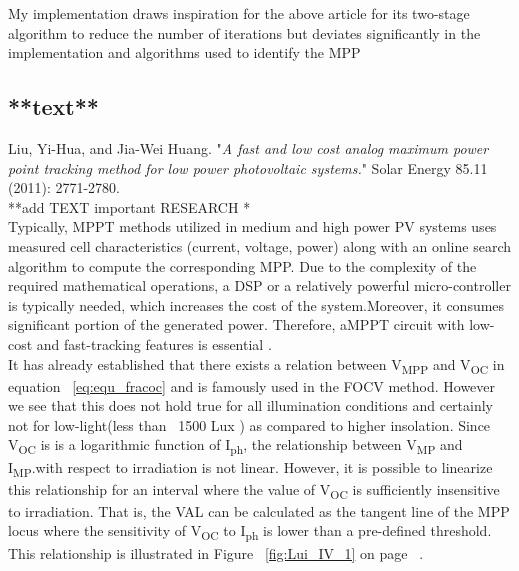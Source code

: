 My implementation draws inspiration for the above article for its  two-stage algorithm to reduce the number of iterations but deviates significantly in the implementation and algorithms used to identify the \ac{MPP} 

\subsection{**text**\cite{liu2011fast}}

Liu, Yi-Hua, and Jia-Wei Huang. "\textit{A fast and low cost analog maximum power point tracking method for low power photovoltaic systems.}" Solar Energy 85.11 (2011): 2771-2780.\\

**add TEXT important RESEARCH * \\

Typically, MPPT methods utilized in medium and high power PV systems uses measured cell characteristics (current, voltage, power) along with an online search algorithm to compute the corresponding \ac{MPP}. Due to the complexity of the required mathematical operations, a \ac{DSP} or a relatively powerful micro-controller is typically needed, which increases the cost of the system.Moreover, it consumes significant portion of the generated power. Therefore, a\ac{MPPT} circuit with low-cost and fast-tracking features is essential .\\

It has already established that there exists a relation between V\textsubscript{MPP} and V\textsubscript{OC} in equation ~\ref{eq:equ_fracoc} and is famously used in the \ac{FOCV} method. However we see that this does not hold true for all illumination conditions and certainly not for low-light(less than ~1500 Lux ) as compared to higher insolation. Since V\textsubscript{OC} is is a logarithmic function of I\textsubscript{ph}, the relationship between  V\textsubscript{MP} and I\textsubscript{MP}.with respect to irradiation is not linear. However, it is possible to linearize this relationship for an interval where the value of V\textsubscript{OC} is sufficiently insensitive to irradiation. That is, the  \ac{VAL} can be calculated as the tangent line of the \ac{MPP} locus where the sensitivity of V\textsubscript{OC} to I\textsubscript{ph} is lower than a pre-defined threshold. This relationship is illustrated in Figure ~\ref{fig:Lui_IV_1} on page ~\pageref{fig:Lui_IV_1}.


